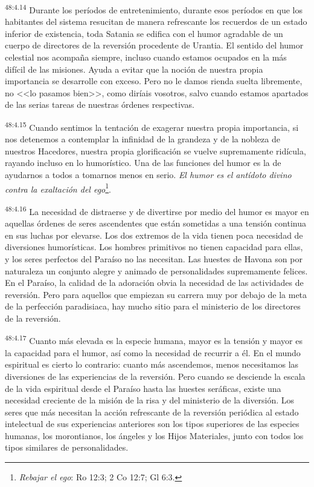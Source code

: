 \par
\textsuperscript{48:4.14} Durante los períodos de entretenimiento, durante esos períodos en que los habitantes del sistema resucitan de manera refrescante los recuerdos de un estado inferior de existencia, toda Satania se edifica con el humor agradable de un cuerpo de directores de la reversión procedente de Urantia. El sentido del humor celestial nos acompaña siempre, incluso cuando estamos ocupados en la más difícil de las misiones. Ayuda a evitar que la noción de nuestra propia importancia se desarrolle con exceso. Pero no le damos rienda suelta libremente, no <<lo pasamos bien>>, como diríais vosotros, salvo cuando estamos apartados de las serias tareas de nuestras órdenes respectivas.

\par
\textsuperscript{48:4.15} Cuando sentimos la tentación de exagerar nuestra propia importancia, si nos detenemos a contemplar la infinidad de la grandeza y de la nobleza de nuestros Hacedores, nuestra propia glorificación se vuelve supremamente ridícula, rayando incluso en lo humorístico. Una de las funciones del humor es la de ayudarnos a todos a tomarnos menos en serio. \textit{El humor es el antídoto divino contra la exaltación del ego}\footnote{\textit{Rebajar el ego}: Ro 12:3; 2 Co 12:7; Gl 6:3.}.

\par
\textsuperscript{48:4.16} La necesidad de distraerse y de divertirse por medio del humor es mayor en aquellas órdenes de seres ascendentes que están sometidas a una tensión continua en sus luchas por elevarse. Los dos extremos de la vida tienen poca necesidad de diversiones humorísticas. Los hombres primitivos no tienen capacidad para ellas, y los seres perfectos del Paraíso no las necesitan. Las huestes de Havona son por naturaleza un conjunto alegre y animado de personalidades supremamente felices. En el Paraíso, la calidad de la adoración obvia la necesidad de las actividades de reversión. Pero para aquellos que empiezan su carrera muy por debajo de la meta de la perfección paradisiaca, hay mucho sitio para el ministerio de los directores de la reversión.

\par
\textsuperscript{48:4.17} Cuanto más elevada es la especie humana, mayor es la tensión y mayor es la capacidad para el humor, así como la necesidad de recurrir a él. En el mundo espiritual es cierto lo contrario: cuanto más ascendemos, menos necesitamos las diversiones de las experiencias de la reversión. Pero cuando se desciende la escala de la vida espiritual desde el Paraíso hasta las huestes seráficas, existe una necesidad creciente de la misión de la risa y del ministerio de la diversión. Los seres que más necesitan la acción refrescante de la reversión periódica al estado intelectual de sus experiencias anteriores son los tipos superiores de las especies humanas, los morontianos, los ángeles y los Hijos Materiales, junto con todos los tipos similares de personalidades.

